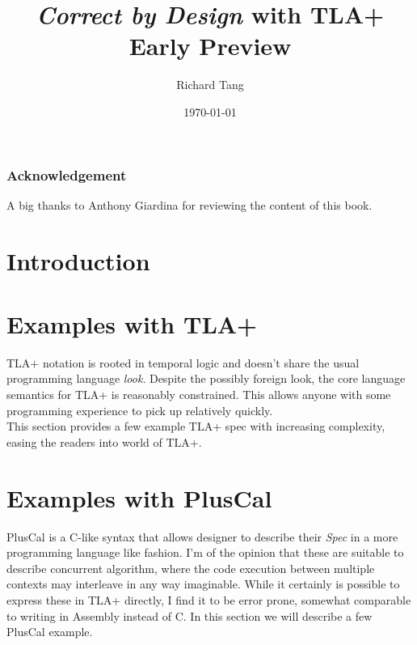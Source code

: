 \documentclass{kdp}
\title{\textit{Correct by Design} with TLA+ \\ Early Preview}
\author{Richard Tang}
\date{\today}
\begin{document}
\maketitle


\section*{Acknowledgement}

A big thanks to Anthony Giardina for reviewing the content of this book.

\tableofcontents

\part{Introduction}





\part{Examples with TLA+}

TLA+ notation is rooted in temporal logic and doesn't share the usual
programming language \textit{look}. Despite the possibly foreign look, the core
language semantics for TLA+ is reasonably constrained. This allows anyone with
some programming experience to pick up relatively quickly. \\

This section provides a few example TLA+ spec with increasing complexity, easing
the readers into world of TLA+.

% 



% 









\part{Examples with PlusCal}

PlusCal is a C-like syntax that allows designer to describe their \textit{Spec}
in a more programming language like fashion. I'm of the opinion that these are
suitable to describe concurrent algorithm, where the code execution between
multiple contexts may interleave in any way imaginable. While it certainly is
possible to express these in TLA+ directly, I find it to be error prone,
somewhat comparable to writing in Assembly instead of C. In this section we will
describe a few PlusCal example.
\end{document}
